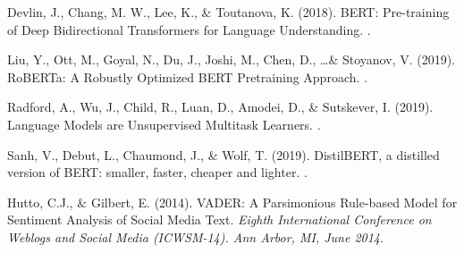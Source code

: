 \documentclass{article}
\begin{document}
\begin{thebibliography}{}

    Devlin, J., Chang, M. W., Lee, K., \& Toutanova, K. (2018). \newblock BERT:
    Pre-training of Deep Bidirectional Transformers for Language Understanding.
    .

    Liu, Y., Ott, M., Goyal, N., Du, J., Joshi, M., Chen, D., \ldots \&
    Stoyanov, V. (2019). \newblock RoBERTa: A Robustly Optimized BERT
    Pretraining
    Approach. .

    Radford, A., Wu, J., Child, R., Luan, D., Amodei, D., \& Sutskever, I.
    (2019). \newblock Language Models are Unsupervised Multitask Learners.
    .

    Sanh, V., Debut, L., Chaumond, J., \& Wolf, T. (2019). \newblock
    DistilBERT, a distilled version of BERT: smaller, faster, cheaper and
    lighter.
    .

    Hutto, C.J., \& Gilbert, E. (2014). \newblock VADER: A Parsimonious
    Rule-based Model for Sentiment Analysis of Social Media Text. \newblock
    {\em
        Eighth International Conference on Weblogs and Social Media (ICWSM-14).
        Ann
        Arbor, MI, June 2014}.

\end{thebibliography}

\thispagestyle{empty}
\end{document}
